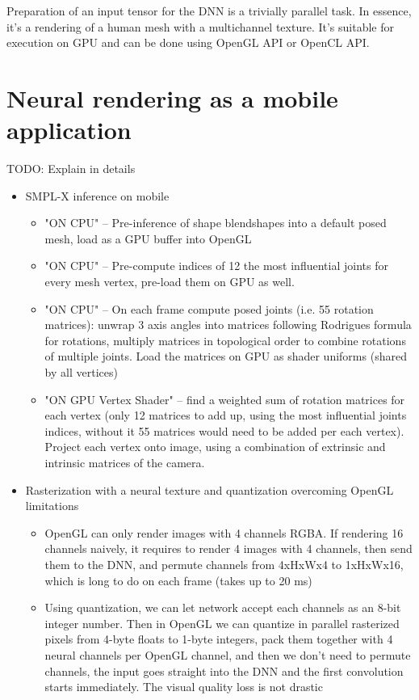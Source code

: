 Preparation of an input tensor for the DNN is a trivially parallel task. In essence, it's a rendering of a human mesh with a multichannel texture. It's suitable for execution on GPU and can be done using OpenGL API or OpenCL API.


\section{Neural rendering as a mobile application}
\label{methods:app}

\alert{TODO: Explain in details}
\begin{itemize}
	\item SMPL-X inference on mobile
	\begin{itemize}
		\item  "ON CPU" -- Pre-inference of shape blendshapes into a default posed mesh, load as a GPU buffer into OpenGL
		\item "ON CPU" -- Pre-compute indices of 12 the most influential joints for every mesh vertex, pre-load them on GPU as well.
		\item "ON CPU" -- On each frame compute posed joints (i.e. 55 rotation matrices): unwrap 3 axis angles into matrices following Rodrigues formula for rotations, multiply matrices in topological order to combine rotations of multiple joints. Load the matrices on GPU as shader uniforms (shared by all vertices)
		\item "ON GPU Vertex Shader" -- find a weighted sum of rotation matrices for each vertex (only 12 matrices to add up, using the most influential joints indices, without it 55 matrices would need to be added per each vertex). Project each vertex onto image, using a combination of extrinsic and intrinsic matrices of the camera.
	\end{itemize}
	\item Rasterization with a neural texture and quantization overcoming OpenGL limitations
	\begin{itemize}
		\item OpenGL can only render images with 4 channels RGBA. If rendering 16 channels naively, it requires to render 4 images with 4 channels, then send them to the DNN, and permute channels from 4xHxWx4 to 1xHxWx16, which is long to do on each frame (takes up to 20 ms)
		\item Using quantization, we can let network accept each channels as an 8-bit integer number. Then in OpenGL we can quantize in parallel rasterized pixels from 4-byte floats to 1-byte integers, pack them together with 4 neural channels per OpenGL channel, and then we don't need to permute channels, the input goes straight into the DNN and the first convolution starts immediately. The visual quality loss is not drastic

\end{itemize}
\end{itemize}
